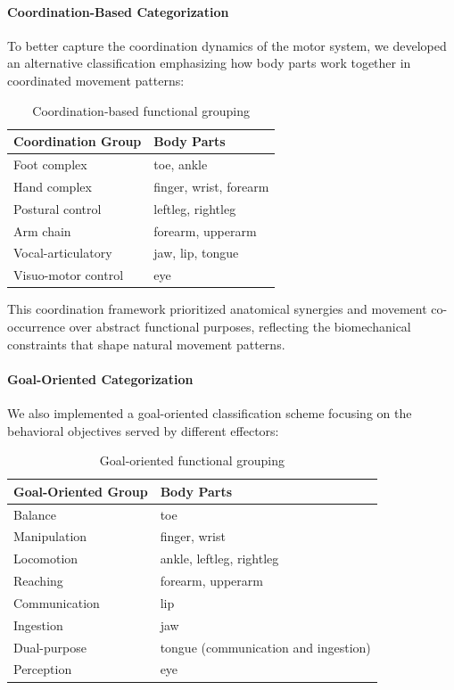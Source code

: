 \documentclass{article}
\begin{document}
\paragraph{Coordination-Based Categorization}
To better capture the coordination dynamics of the motor system, we developed an alternative classification emphasizing how body parts work together in coordinated movement patterns:

\begin{table}[h]
\centering
\begin{tabular}{|l|l|}
\hline
\textbf{Coordination Group} & \textbf{Body Parts} \\
\hline
Foot complex & toe, ankle \\
Hand complex & finger, wrist, forearm \\
Postural control & leftleg, rightleg \\
Arm chain & forearm, upperarm \\
Vocal-articulatory & jaw, lip, tongue \\
Visuo-motor control & eye \\
\hline
\end{tabular}
\caption{Coordination-based functional grouping}
\label{tab:coordination_func}
\end{table}

This coordination framework prioritized anatomical synergies and movement co-occurrence over abstract functional purposes, reflecting the biomechanical constraints that shape natural movement patterns.

\paragraph{Goal-Oriented Categorization}
We also implemented a goal-oriented classification scheme focusing on the behavioral objectives served by different effectors:

\begin{table}[h]
\centering
\begin{tabular}{|l|l|}
\hline
\textbf{Goal-Oriented Group} & \textbf{Body Parts} \\
\hline
Balance & toe \\
Manipulation & finger, wrist \\
Locomotion & ankle, leftleg, rightleg \\
Reaching & forearm, upperarm \\
Communication & lip \\
Ingestion & jaw \\
Dual-purpose & tongue (communication and ingestion) \\
Perception & eye \\
\hline
\end{tabular}
\caption{Goal-oriented functional grouping}
\label{tab:goal_func}
\end{table}
\end{document}
